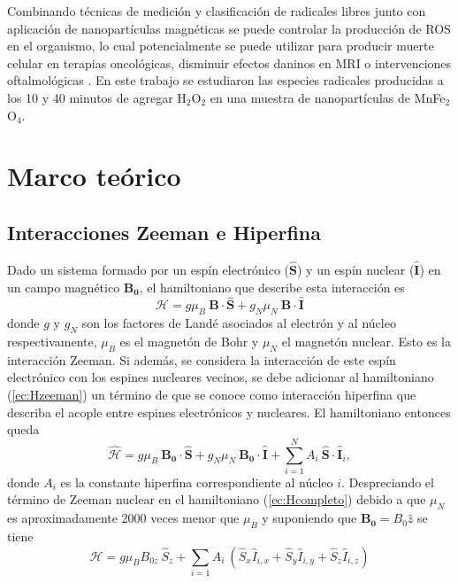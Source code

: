 \documentclass[aps,prl,reprint,superscriptaddress,showkeys]{revtex4-2}
\begin{document}
Combinando técnicas de medición y clasificación de radicales libres junto con aplicación de nanopartículas magnéticas se puede controlar la producción de ROS en el organismo, lo cual potencialmente se puede utilizar para producir muerte celular en terapias oncológicas, disminuir efectos daninos en MRI o intervenciones oftalmológicas \cite{zhou_reactive_2016}\cite{abdal_dayem_role_2017}. En este trabajo se estudiaron las especies radicales producidas a los 10 y 40 minutos de agregar H$_2$O$_2$ en una muestra de nanopartículas de MnFe$_2$O$_4$.


\section{Marco teórico \label{sec:teoriaEPR}}

\subsection{Interacciones Zeeman e Hiperfina \label{sec:interacciones}}
Dado un sistema formado por un espín electrónico ($\mathbf{\hat{S}}$) y un espín nuclear ($\mathbf{\hat{I}}$) en un campo magnético $\mathbf{B_0}$, el hamiltoniano que describe esta interacción es \cite{weil_electron_2007}
\begin{equation}
    \mathcal{H} = g \mu_B ~ \mathbf{B} \cdot \mathbf{\hat{S}} + g_N \mu_N ~\mathbf{B} \cdot \mathbf{\hat{I}}
    \label{ec:Hzeeman}
\end{equation}
donde $g$ y $g_N$ son los factores de Landé asociados al electrón y al núcleo respectivamente, $\mu_B$ es el magnetón de Bohr y $\mu_N$ el magnetón nuclear. Esto es la interacción Zeeman. Si además, se considera la interacción de este espín electrónico con los espines nucleares vecinos, se debe adicionar al hamiltoniano (\ref*{ec:Hzeeman}) un término de que se conoce como interacción hiperfina que describa el acople entre espines electrónicos y nucleares. El hamiltoniano entonces queda
\begin{equation}
    \mathcal{\hat{H}} = g \mu_B ~\mathbf{B_0} \cdot \mathbf{\hat{S}} + g_N \mu_N ~\mathbf{B_0} \cdot \mathbf{\hat{I}} + \sum_{i=1}^{N} A_i~ \mathbf{\hat{S}} \cdot \mathbf{\hat{I}}_i,
    \label{ec:Hcompleto}
\end{equation}
donde $A_i$ es la constante hiperfina correspondiente al núcleo $i$. Despreciando el término de Zeeman nuclear en el hamiltoniano (\ref*{ec:Hcompleto}) debido a que $\mu_N$ es aproximadamente 2000 veces menor que $\mu_B$ y suponiendo que $\mathbf{B_0} = B_0 \hat{z}$ se tiene
\begin{equation}
    \mathcal{H} = g \mu_B B_{0z} ~\hat{S}_z + \sum_{i=1} A_i~ (\hat{S}_x \hat{I}_{i,x} + \hat{S}_y \hat{I}_{i,y} + \hat{S}_z \hat{I}_{i,z})  
\end{equation}
\end{document}
